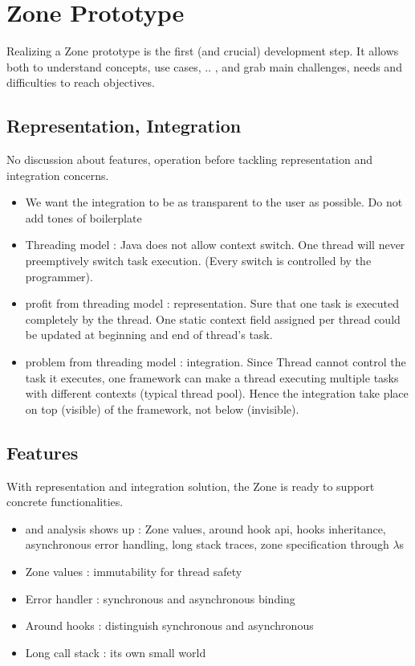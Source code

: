 
\chapter{Zone Prototype}

Realizing a Zone prototype is the first (and crucial) development step. It allows both to understand concepts, use cases, .. , and grab main challenges, needs and difficulties to reach objectives.

\section{Representation, Integration}

No discussion about features, operation before tackling representation and integration concerns.

\begin{itemize}
\item We want the integration to be as transparent to the user as possible. Do not add tones of boilerplate
\item Threading model : Java does not allow context switch. One thread will never preemptively switch task execution. (Every switch is controlled by the programmer).
\item profit from threading model : representation. Sure that one task is executed completely by the thread. One static context field assigned per thread could be updated at beginning and end of thread's task.
\item problem from threading model : integration. Since Thread cannot control the task it executes, one framework can make a thread executing multiple tasks with different contexts (typical thread pool). Hence the integration take place on top (visible) of the framework, not below (invisible).
\end{itemize}

\section{Features}

With representation and integration solution, the Zone is ready to support concrete functionalities.

\begin{itemize}
\item \zonejs and \zonedrt analysis shows up : Zone values, around hook api, hooks inheritance, asynchronous error handling, long stack traces, zone specification through $\lambda$s
\item Zone values : immutability for thread safety
\item Error handler : synchronous and asynchronous binding
\item Around hooks : distinguish synchronous and asynchronous
\item Long call stack : its own small world
\end{itemize}

